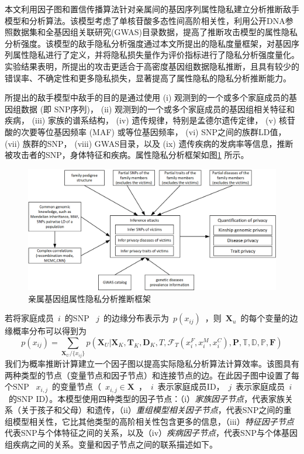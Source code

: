 \documentclass[pdftex,notypeinfo,twoside,openany,UTF8,fntef]{CASthesis}
\theoremstyle{THrm}{
	\newtheorem{question}{Question}[section]
	\newtheorem{property}{性质}[section]
	\newtheorem{assumption}{假设}[section]
	\newtheorem{claim}[lemma]{断言}
	
}
\begin{document}
本文利用因子图和置信传播算法针对亲属间的基因序列属性隐私建立分析推断敌手模型和分析算法。该模型考虑了单核苷酸多态性间高阶相关性，利用公开DNA参照数据集和全基因组关联研究(GWAS)目录数据，提高了推断攻击模型的属性隐私分析强度。该模型的敌手隐私分析强度通过本文所提出的隐私度量框架，对基因序列属性隐私进行了定义，并将隐私损失量作为评价指标进行了隐私分析强度量化。实验结果表明，所提出的攻击更适合于高密度基因组数据隐私推断，且具有较少的错误率、不确定性和更多隐私损失，显著提高了属性隐私的隐私分析推断能力。

所提出的敌手模型中敌手的目的是通过使用 (i) 观测到的一个或多个家庭成员的基因组数据 (即 SNP序列)，  (ii) 观测到的一个或多个家庭成员的基因组相关特征和疾病， (iii) 家族的谱系结构， (iv) 遗传规律，特别是孟德尔遗传定律， (v) 核苷酸的次要等位基因频率 (MAF) 或等位基因频率， (vi) SNP之间的族群LD值， (vii) 族群的SNP， (viii) GWAS目录，以及 (ix) 遗传疾病的发病率等信息，推断被攻击者的SNP，身体特征和疾病。属性隐私分析框架如图\ref{fig:attack-framework} 所示。
\begin{figure}[htbp]
	\centering
	\includegraphics[width=0.95\linewidth]{./figures/attack-framework.png}
	\centering
	\caption{亲属基因组属性隐私分析推断框架}\label{fig:attack-framework}
\end{figure}

若将家庭成员~$i$~的SNP ~$j$~的边缘分布表示为~$p(x_{ij})$~，则~$\mathbf{X}_u$~的每个变量的边缘概率分布可以得到为
\begin{equation}
p(x_{ij})= \sum_{\mathbf{X}_U/\{x_{ij}\}} p(\mathbf{X}_U | \mathbf{X}_K, \mathbf{T}_K, \mathbf{D}_K, T,  \mathcal{F}_T(x_i^F,x_i^M,x_i^C), \mathbf{P}, \mathbb{T}, \mathbb{D}, \mathbb{P}, \mathbf{F})
\end{equation}
我们为概率推断计算建立一个因子图以提高实际隐私分析算法计算效率。该图具有两种类型的节点（变量节点和因子节点）和连接节点的边。在此因子图中设置了每个SNP ~$x_{i,j}$~的变量节点（~$x_{i,j}\in \mathbf{X}$~，~$i$~表示家庭成员ID，~$j$~表示家庭成员~$i$~的SNP ID）。本模型使用四种类型的因子节点：（i）\emph{家族因子节点}，代表家族关系（关于孩子和父母）和遗传，（ii）\emph{重组模型相关因子节点}，代表SNP之间的重组模型相关性，它比其他类型的高阶相关性包含更多的信息，（iii）\emph{特征因子节点}代表SNP与个体特征之间的关系，以及（iv）\emph{疾病因子节点}，代表SNP与个体基因组疾病之间的关系。变量和因子节点之间的联系描述如下。
\end{document}
